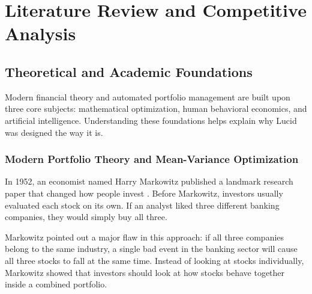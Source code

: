 \chapter{Literature Review and Competitive Analysis}

\section{Theoretical and Academic Foundations}
Modern financial theory and automated portfolio management are built upon three core subjects: mathematical optimization, human behavioral economics, and artificial intelligence. Understanding these foundations helps explain why Lucid was designed the way it is.

\subsection{Modern Portfolio Theory and Mean-Variance Optimization}
In 1952, an economist named Harry Markowitz published a landmark research paper that changed how people invest \cite{markowitz1952}. Before Markowitz, investors usually evaluated each stock on its own. If an analyst liked three different banking companies, they would simply buy all three. 

Markowitz pointed out a major flaw in this approach: if all three companies belong to the same industry, a single bad event in the banking sector will cause all three stocks to fall at the same time. Instead of looking at stocks individually, Markowitz showed that investors should look at how stocks behave together inside a combined portfolio.

